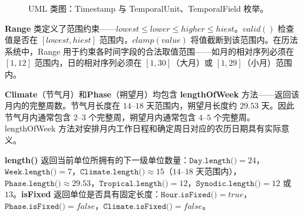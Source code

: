 \begin{figure}[htbp]
{%
    }
    \caption{UML 类图：Timestamp 与 TemporalUnit、TemporalField 枚举。}
    \label{fig:uml_timestamp}
\end{figure}

\begin{remark}\label{rem:range_class}
\textbf{Range} 类定义了范围约束——\(lowest\le lower\le higher\le hiest\)。\(valid()\) 检查值是否在 \([lowest,hiest]\) 范围内，\(clamp(value)\) 将值截断到该范围内。在历法系统中，Range 用于约束各时间字段的合法取值范围——如月的相对序列必须在 \([1,12]\) 范围内，日的相对序列必须在 \([1,30]\)（大月）或 \([1,29]\)（小月）范围内。
\end{remark}

\begin{remark}\label{rem:climate_phase_length}
\textbf{Climate}（节气月）和\textbf{Phase}（朔望月）均包含 \textbf{lengthOfWeek} 方法——返回该月内的完整周数。节气月长度在 \(14\)--\(18\) 天范围内，朔望月长度约 \(29.53\) 天。因此节气月内通常包含 \(2\)--\(3\) 个完整周，朔望月内通常包含 \(4\)--\(5\) 个完整周。lengthOfWeek 方法对安排月内工作日程和确定周日对应的农历日期具有实际意义。
\end{remark}

\begin{remark}\label{rem:temporal_unit_length}
\textbf{length()} 返回当前单位所拥有的下一级单位数量：\(\texttt{Day.length()}=24\)，\(\texttt{Week.length()}=7\)，\(\texttt{Climate.length()}\approx 15\)（\(14\)--\(18\) 天范围内），\(\texttt{Phase.length()}\approx 29.53\)，\(\texttt{Tropical.length()}=12\)，\(\texttt{Synodic.length()}=12\) 或 \(13\)。\textbf{isFixed} 返回单位是否具有固定长度：\(\texttt{Hour.isFixed()}=true\)，\(\texttt{Phase.isFixed()}=false\)，\(\texttt{Climate.isFixed()}=false\)。
\end{remark}

